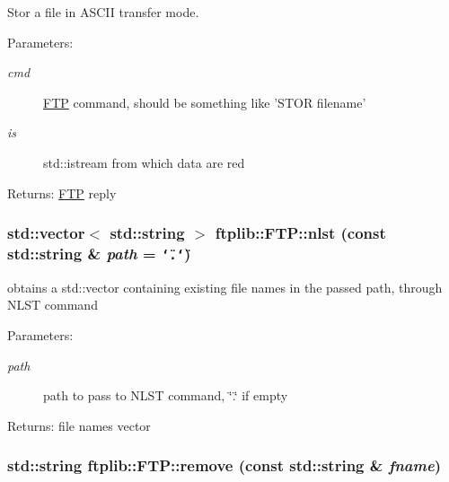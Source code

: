 Stor a file in ASCII transfer mode. 

\begin{Desc}
\item[Parameters:]
\begin{description}
\item[{\em cmd}]\hyperlink{classftplib_1_1FTP}{FTP} command, should be something like 'STOR filename' \item[{\em is}]std::istream from which data are red \end{description}
\end{Desc}
\begin{Desc}
\item[Returns:]\hyperlink{classftplib_1_1FTP}{FTP} reply \end{Desc}
\hypertarget{classftplib_1_1FTP_a793fa113ee6fc82e3db3b7ed769ff3f}{
\subsubsection{\setlength{\rightskip}{0pt plus 5cm}std::vector$<$ std::string $>$ ftplib::FTP::nlst (const std::string \& {\em path} = {\tt \char`\"{}.\char`\"{}})}}
\label{classftplib_1_1FTP_a793fa113ee6fc82e3db3b7ed769ff3f}


obtains a std::vector containing existing file names in the passed path, through NLST command 

\begin{Desc}
\item[Parameters:]
\begin{description}
\item[{\em path}]path to pass to NLST command, \char`\"{}.\char`\"{} if empty \end{description}
\end{Desc}
\begin{Desc}
\item[Returns:]file names vector \end{Desc}
\hypertarget{classftplib_1_1FTP_00e0a674ee47139d6205cd95cef42e73}{
\subsubsection{\setlength{\rightskip}{0pt plus 5cm}std::string ftplib::FTP::remove (const std::string \& {\em fname})}}
\label{classftplib_1_1FTP_00e0a674ee47139d6205cd95cef42e73}



